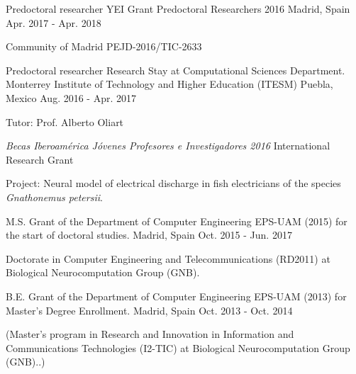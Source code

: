 

\begin{cventries}

  \cventry
    {Predoctoral researcher} %
    {YEI Grant Predoctoral Researchers 2016} %
    {Madrid, Spain} %
    {Apr. 2017 - Apr. 2018} %
    {
      \begin{cvitems} %
        \item {Community of Madrid PEJD-2016/TIC-2633}
      \end{cvitems}
    }

  \cventry
    {Predoctoral researcher} %
    {Research Stay at Computational Sciences Department. Monterrey Institute of Technology and Higher Education (ITESM)} %
    {Puebla, Mexico} %
    {Aug. 2016 - Apr. 2017} %
    {
    \begin{cvitems}
     \item {Tutor: Prof. Alberto Oliart}
     \item {\textit{Becas Iberoamérica Jóvenes Profesores e Investigadores 2016} International Research Grant}
     \item {Project: Neural model of electrical discharge in fish electricians of the species \textit{Gnathonemus petersii}.}
    \end{cvitems}
    }

  \cventry
    {M.S.} %
    {Grant of the Department of Computer Engineering EPS-UAM (2015) for the start of doctoral studies.} %
    {Madrid, Spain} %
    {Oct. 2015 - Jun. 2017} %
    {
      \begin{cvitems} %
        \item {Doctorate in Computer Engineering and Telecommunications (RD2011) at Biological Neurocomputation Group (GNB).}
      \end{cvitems}
    }

  \cventry
    {B.E.} %
    {Grant of the Department of Computer Engineering EPS-UAM (2013) for Master's Degree Enrollment.} %
    {Madrid, Spain} %
    {Oct. 2013 - Oct. 2014} %
    {
     \begin{cvitems}
     	\item (Master's program in Research and Innovation in Information and Communications Technologies (I2-TIC) at Biological Neurocomputation Group (GNB)..)
     \end{cvitems}
    }

\end{cventries}